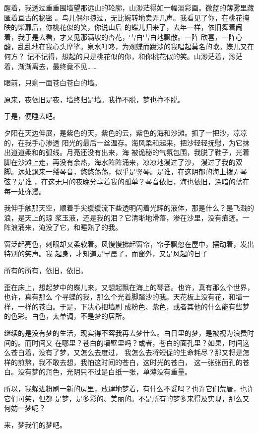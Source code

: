 \documentclass[12pt,a4paper]{article}
\begin{document}
		醒着，我透过重重围墙望那远山的轮廓，山渺茫得如一幅淡彩画。微蓝的薄雾里藏匿着亘古的秘密
	。鸟儿偶尔掠过，无比婉转地卖弄几声。我看见了你，在桃花掩映的柴扉后，你桃花似的笑，你说山后
	的蝶儿归来了，去年一样，依旧舞着闹着，我于是去看，才又见那满坡的杏花，雪白雪白地飘散。一阵
	欣喜，一阵心酸，乱乱地在我心头摩挲。泉水叮咚，为观蝶而跋涉的我唱起莫名的歌。蝶儿又在何方？
	记不记得，想起的只是桃花似的你，和你桃花似的笑。山渺茫着，渺茫着，渐渐离去，最终竟不见……

		眼前，只剩一面苍白苍白的墙。

		原来，夜依旧是夜，墙终归是墙。我挣不脱，梦也挣不脱。

		于是，便睡去吧。

		夕阳在天边伸展，是紫色的天，紫色的云，紫色的海和沙滩。抓了一把沙，凉凉的，在我手心渗透
	阳光的最后一丝温存。海风柔和起来，把沙轻轻抚慰，为它抹出道道柔和的弧线。月亮还没有出来，海
	被诡秘的气氛包围，我脱了鞋子，光着脚在沙滩上走，再没有余热，海水阵阵涌来，凉凉地漫过了沙，
	漫过了我的双脚。远处飘来一缕琴音，悠悠荡荡，似乎是竖琴。是谁，在这阴郁的海上拨弄琴弦？是谁
	，在这无月的夜晚分享着我的孤单？琴音依旧，海也依旧，深暗的蓝在每一处弥漫。

		我伸手触那天空，顺着手尖缓缓流下些透明闪着光辉的液体，那是什么？是飞溅的浪，是天上的琼
	浆玉液，还是我的泪？它清晰地滑落，渗在沙里，没有痕迹。一阵浪涌来，淹没了它，和睡熟了的我。

		窗泛起亮色，刺眼却又柔软着。风慢慢拂起窗帘，帘子飘忽在屋中，摆动着，发出特别的笑声。我
	起身，才知道是早晨了，而窗外，又是风起的日子

		所有的所有，依旧，依旧。

		歪在床上，想起梦中的蝶儿来，又想起飘在海上的琴音。也许，真有那么个世界，也许，真有那么
	个寻蝶的我，那么个光着脚踏沙的我。天花板上没有花，和墙一样，一样的苍白。于是，下决心把墙刷
	成粉色、紫色，或者其他的什么能有些梦的色彩。白色，太单调，不是梦的居所。

		继续的是没有梦的生活，现实得不容我再去梦什么。白日里的梦，是被视为浪费时间的。而时间又
	在哪里？苍白的墙壁里吗？或者，苍白的面孔里？如果，时间这么苍白着，没有了梦，又怎么去度过，
	我怎么去将短促的生命耗尽？那又将是怎样的煎熬，我不敢去想，我怕这时间的苍白，这时光的苍白，
	这一张张面孔的苍白。没有梦的润色，光阴只不过是白纸一张，单薄没有重量。

		所以，我躲进粉刷一新的房里，放肆地梦着，有什么不妥吗？也许它们荒唐，也许它们可笑，但都
	是梦，是多彩的、美丽的。不是所有的梦多来得及实现，那么又何妨一梦呢？

		来，梦我们的梦吧。
\end{document}

